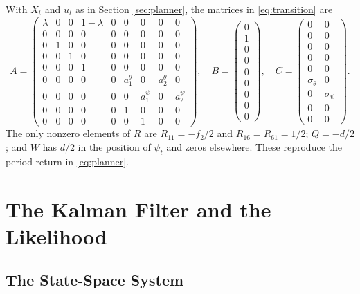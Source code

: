 \documentclass[12pt]{article}
\begin{document}
With $X_t$ and $u_t$ as in Section \ref{sec:planner}, the matrices in \eqref{eq:transition} are
{\small
\[
A = \begin{pmatrix}
\lambda & 0 & 0 & 1-\lambda & 0 & 0 & 0 & 0 & 0\\
0 & 0 & 0 & 0 & 0 & 0 & 0 & 0 & 0\\
0 & 1 & 0 & 0 & 0 & 0 & 0 & 0 & 0\\
0 & 0 & 1 & 0 & 0 & 0 & 0 & 0 & 0\\
0 & 0 & 0 & 1 & 0 & 0 & 0 & 0 & 0\\
0 & 0 & 0 & 0 & 0 & a^{\theta}_1 & 0 & a^{\theta}_2 & 0\\
0 & 0 & 0 & 0 & 0 & 0 & a^{\psi}_1 & 0 & a^{\psi}_2\\
0 & 0 & 0 & 0 & 0 & 1 & 0 & 0 & 0\\
0 & 0 & 0 & 0 & 0 & 0 & 1 & 0 & 0
\end{pmatrix},
\quad
B = \begin{pmatrix} 0\\1\\0\\0\\0\\0\\0\\0\\0 \end{pmatrix},
\quad
C = \begin{pmatrix} 0&0\\0&0\\0&0\\0&0\\0&0\\ \sigma_\theta&0\\ 0&\sigma_\psi\\ 0&0\\ 0&0 \end{pmatrix}.
\]
}
The only nonzero elements of $R$ are $R_{11} = -f_2/2$ and $R_{16} = R_{61} = 1/2$; $Q = -d/2$; and $W$ has $d/2$ in the position of $\psi_t$ and zeros elsewhere. These reproduce the period return in \eqref{eq:planner}.

\section{The Kalman Filter and the Likelihood}\label{app:kalman}

\subsection{The State-Space System}\label{app:ssm}
\end{document}
